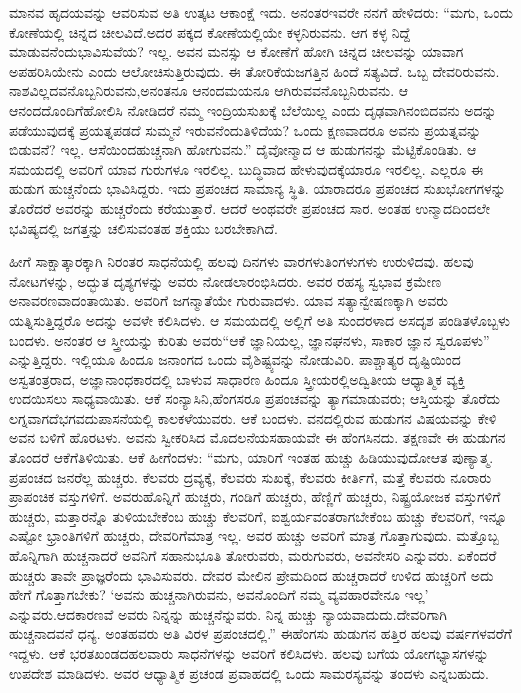 ಮಾನವ ಹೃದಯವನ್ನು ಆವರಿಸುವ ಅತಿ ಉತ್ಕಟ ಆಕಾಂಕ್ಷೆ ಇದು. ಅನಂತರ\break ಇವರೇ ನನಗೆ ಹೇಳಿದರು: “ಮಗು, ಒಂದು ಕೋಣೆಯಲ್ಲಿ ಚಿನ್ನದ ಚೀಲವಿದೆ.\break ಅದರ ಪಕ್ಕದ ಕೋಣೆಯಲ್ಲಿಯೇ ಕಳ್ಳನಿರುವನು. ಆಗ ಕಳ್ಳ ನಿದ್ದೆ ಮಾಡುವನೆಂದು\break ಭಾವಿಸುವೆಯ? ಇಲ್ಲ. ಅವನ ಮನಸ್ಸು ಆ ಕೋಣೆಗೆ ಹೋಗಿ ಚಿನ್ನದ ಚೀಲವನ್ನು ಯಾವಾಗ ಅಪಹರಿಸಿಯೇನು ಎಂದು ಆಲೋಚಿಸುತ್ತಿರುವುದು. ಈ ತೋರಿಕೆಯ\break ಜಗತ್ತಿನ ಹಿಂದೆ ಸತ್ಯವಿದೆ. ಒಬ್ಬ ದೇವರಿರುವನು. ನಾಶವಿಲ್ಲದವನೊಬ್ಬನಿರುವನು,\break ಅನಂತನೂ ಆನಂದಮಯನೂ ಆಗಿರುವವನೊಬ್ಬನಿರುವನು. ಆ ಆನಂದದೊಂದಿಗೆ\break ಹೋಲಿಸಿ ನೋಡಿದರೆ ನಮ್ಮ ಇಂದ್ರಿಯಸುಖಕ್ಕೆ ಬೆಲೆಯಿಲ್ಲ ಎಂದು ದೃಢವಾಗಿ\break ನಂಬಿದವನು ಅದನ್ನು ಪಡೆಯುವುದಕ್ಕೆ ಪ್ರಯತ್ನಪಡದೆ ಸುಮ್ಮನೆ ಇರುವನೆಂದು\break ತಿಳಿದೆಯ? ಒಂದು ಕ್ಷಣವಾದರೂ ಅವನು ಪ್ರಯತ್ನವನ್ನು ಬಿಡುವನೆ? ಇಲ್ಲ. ಆಸೆಯಿಂದ\break ಹುಚ್ಚನಾಗಿ ಹೋಗುವನು.” ದೈವೋನ್ಮಾದ ಆ ಹುಡುಗನನ್ನು ಮೆಟ್ಟಿಕೊಂಡಿತು. ಆ ಸಮಯದಲ್ಲಿ ಅವರಿಗೆ ಯಾವ ಗುರುಗಳೂ ಇರಲಿಲ್ಲ. ಬುದ್ಧಿವಾದ ಹೇಳುವುದಕ್ಕೆ\break ಯಾರೂ ಇರಲಿಲ್ಲ. ಎಲ್ಲರೂ ಈ ಹುಡುಗ ಹುಚ್ಚನೆಂದು ಭಾವಿಸಿದ್ದರು. ಇದು ಪ್ರಪಂಚದ ಸಾಮಾನ್ಯ ಸ್ಥಿತಿ. ಯಾರಾದರೂ ಪ್ರಪಂಚದ ಸುಖಭೋಗಗಳನ್ನು ತೊರೆದರೆ ಅವರನ್ನು ಹುಚ್ಚರೆಂದು ಕರೆಯುತ್ತಾರೆ. ಆದರೆ ಅಂಥವರೇ ಪ್ರಪಂಚದ ಸಾರ. ಅಂತಹ ಉನ್ಮಾದದಿಂದಲೇ ಭವಿಷ್ಯದಲ್ಲಿ ಜಗತ್ತನ್ನು ಚಲಿಸುವಂತಹ ಶಕ್ತಿಯು ಬರಬೇಕಾಗಿದೆ.

ಹೀಗೆ ಸಾಕ್ಷಾತ್ಕಾರಕ್ಕಾಗಿ ನಿರಂತರ ಸಾಧನೆಯಲ್ಲಿ ಹಲವು ದಿನಗಳು ವಾರಗಳು\break ತಿಂಗಳುಗಳು ಉರುಳಿದವು. ಹಲವು ನೋಟಗಳನ್ನು, ಅದ್ಭುತ ದೃಶ್ಯಗಳನ್ನು ಅವರು ನೋಡಲಾರಂಭಿಸಿದರು. ಅವರ ರಹಸ್ಯ ಸ್ವಭಾವ ಕ್ರಮೇಣ ಅನಾವರಣವಾದಂತಾಯಿತು. ಅವರಿಗೆ ಜಗನ್ಮಾತೆಯೇ ಗುರುವಾದಳು. ಯಾವ ಸತ್ಯಾನ್ವೇಷಣಕ್ಕಾಗಿ ಅವರು ಯತ್ನಿಸುತ್ತಿದ್ದರೊ ಅದನ್ನು ಅವಳೇ ಕಲಿಸಿದಳು. ಆ ಸಮಯದಲ್ಲಿ ಅಲ್ಲಿಗೆ ಅತಿ ಸುಂದರಳಾದ ಅಸದೃಶ ಪಂಡಿತಳೊಬ್ಬಳು ಬಂದಳು. ಅನಂತರ ಆ ಸ್ತ್ರೀಯನ್ನು ಕುರಿತು ಅವರು\break “ಆಕೆ ಜ್ಞಾನಿಯಲ್ಲ, ಜ್ಞಾನಘನಳು, ಸಾಕಾರ ಜ್ಞಾನ ಸ್ವರೂಪಳು” ಎನ್ನುತ್ತಿದ್ದರು. ಇಲ್ಲಿಯೂ ಹಿಂದೂ ಜನಾಂಗದ ಒಂದು ವೈಶಿಷ್ಟ್ಯವನ್ನು ನೋಡುವಿರಿ. ಪಾಶ್ಚಾತ್ಯರ ದೃಷ್ಟಿಯಿಂದ ಅಸ್ವತಂತ್ರರಾದ, ಅಜ್ಞಾನಾಂಧಕಾರದಲ್ಲಿ ಬಾಳುವ ಸಾಧಾರಣ ಹಿಂದೂ ಸ್ತ್ರೀಯರಲ್ಲಿ\break ಅದ್ವಿತೀಯ ಆಧ್ಯಾತ್ಮಿಕ ವ್ಯಕ್ತಿ ಉದಯಿಸಲು ಸಾಧ್ಯವಾಯಿತು. ಆಕೆ ಸಂನ್ಯಾಸಿನಿ,\break ಹೆಂಗಸರೂ ಪ್ರಪಂಚವನ್ನು ತ್ಯಾಗಮಾಡುವರು; ಆಸ್ತಿಯನ್ನು ತೊರೆದು ಲಗ್ನವಾಗದೆ\break ಭಗವದುಪಾಸನೆಯಲ್ಲಿ ಕಾಲಕಳೆಯುವರು. ಆಕೆ ಬಂದಳು. ವನದಲ್ಲಿರುವ ಹುಡುಗನ ವಿಷಯವನ್ನು ಕೇಳಿ ಅವನ ಬಳಿಗೆ ಹೊರಟಳು. ಅವನು ಸ್ವೀಕರಿಸಿದ ಮೊದಲನೆಯ\break ಸಹಾಯವೇ ಈ ಹೆಂಗಸಿನದು. ತಕ್ಷಣವೇ ಈ ಹುಡುಗನ ತೊಂದರೆ ಆಕೆಗೆ\break ತಿಳಿಯಿತು. ಆಕೆ ಹೀಗೆಂದಳು: “ಮಗು, ಯಾರಿಗೆ ಇಂತಹ ಹುಚ್ಚು ಹಿಡಿಯುವುದೋ\break ಆತ ಪುಣ್ಯಾತ್ಮ. ಪ್ರಪಂಚದ ಜನರೆಲ್ಲ ಹುಚ್ಚರು. ಕೆಲವರು ದ್ರವ್ಯಕ್ಕೆ, ಕೆಲವರು ಸುಖಕ್ಕೆ, ಕೆಲವರು ಕೀರ್ತಿಗೆ, ಮತ್ತೆ ಕೆಲವರು ನೂರಾರು ಪ್ರಾಪಂಚಿಕ ವಸ್ತುಗಳಿಗೆ. ಅವರು\break ಹೊನ್ನಿಗೆ ಹುಚ್ಚರು, ಗಂಡಿಗೆ ಹುಚ್ಚರು, ಹೆಣ್ಣಿಗೆ ಹುಚ್ಚರು, ನಿಷ್ಟ್ರಯೋಜಕ ವಸ್ತುಗಳಿಗೆ ಹುಚ್ಚರು, ಮತ್ತಾರನ್ನೊ ತುಳಿಯಬೇಕೆಂಬ ಹುಚ್ಚು ಕೆಲವರಿಗೆ, ಐಶ್ವರ್ಯವಂತರಾಗಬೇಕೆಂಬ ಹುಚ್ಚು ಕೆಲವರಿಗೆ, ಇನ್ನೂ ಎಷ್ಟೋ ಭ್ರಾಂತಿಗಳಿಗೆ ಹುಚ್ಚರು, ದೇವರಿಗೆ\break ಮಾತ್ರ ಇಲ್ಲ. ಅವರ ಹುಚ್ಚು ಅವರಿಗೆ ಮಾತ್ರ ಗೊತ್ತಾಗುವುದು. ಮತ್ತೊಬ್ಬ ಹೊನ್ನಿಗಾಗಿ ಹುಚ್ಚನಾದರೆ ಅವನಿಗೆ ಸಹಾನುಭೂತಿ ತೋರುವರು, ಮರುಗುವರು, ಅವನೇ\break ಸರಿ ಎನ್ನುವರು. ಏಕೆಂದರೆ ಹುಚ್ಚರು ತಾವೇ ಪ್ರಾಜ್ಞರೆಂದು ಭಾವಿಸುವರು. ದೇವರ ಮೇಲಿನ ಪ್ರೇಮದಿಂದ ಹುಚ್ಚರಾದರೆ ಉಳಿದ ಹುಚ್ಚರಿಗೆ ಅದು ಹೇಗೆ ಗೊತ್ತಾಗಬೇಕು? ‘ಅವನು ಹುಚ್ಚನಾಗಿರುವನು, ಅವನೊಂದಿಗೆ ನಮ್ಮ ವ್ಯವಹಾರವೇನೂ ಇಲ್ಲ’ ಎನ್ನುವರು.\break ಆದಕಾರಣವೆ ಅವರು ನಿನ್ನನ್ನು ಹುಚ್ಚನೆನ್ನುವರು. ನಿನ್ನ ಹುಚ್ಚು ನ್ಯಾಯವಾದುದು.\break ದೇವರಿಗಾಗಿ ಹುಚ್ಚನಾದವನೆ ಧನ್ಯ. ಅಂತಹವರು ಅತಿ ವಿರಳ ಪ್ರಪಂಚದಲ್ಲಿ.” ಈ\break ಹೆಂಗಸು ಹುಡುಗನ ಹತ್ತಿರ ಹಲವು ವರ್ಷಗಳವರೆಗೆ ಇದ್ದಳು. ಆಕೆ ಭರತಖಂಡದ\break ಹಲವಾರು ಸಾಧನೆಗಳನ್ನು ಅವರಿಗೆ ಕಲಿಸಿದಳು. ಹಲವು ಬಗೆಯ ಯೋಗಭ್ಯಾಸಗಳನ್ನು ಉಪದೇಶ ಮಾಡಿದಳು. ಅವರ ಆಧ್ಯಾತ್ಮಿಕ ಪ್ರಚಂಡ ಪ್ರವಾಹದಲ್ಲಿ ಒಂದು ಸಾಮರಸ್ಯವನ್ನು ತಂದಳು ಎನ್ನಬಹುದು.

